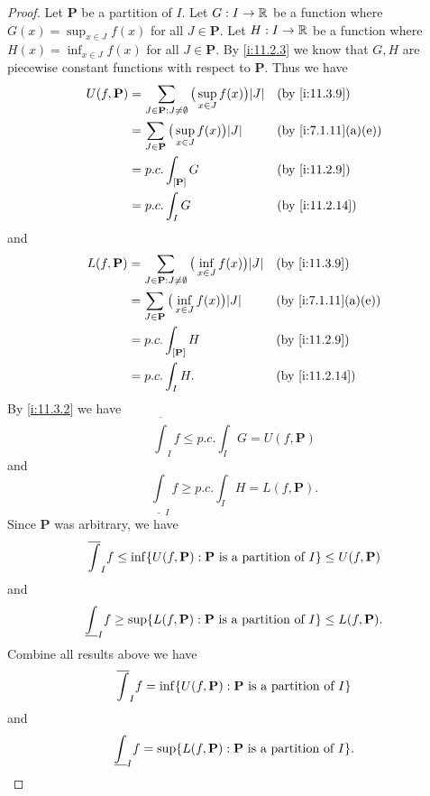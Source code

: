 \begin{proof}
  Let \(\mathbf{P}\) be a partition of \(I\).
  Let \(G : I \to \mathbb{R}\) be a function where \(G(x) = \sup_{x \in J} f(x)\) for all \(J \in \mathbf{P}\).
  Let \(H : I \to \mathbb{R}\) be a function where \(H(x) = \inf_{x \in J} f(x)\) for all \(J \in \mathbf{P}\).
  By \cref{i:11.2.3} we know that \(G, H\) are piecewise constant functions with respect to \(\mathbf{P}\).
  Thus we have
  \begin{align*}
    U(f, \mathbf{P}) & = \sum_{J \in \mathbf{P} : J \neq \emptyset} \big(\sup_{x \in J} f(x)\big) \abs{J} &  & \by{i:11.3.9}      \\
                     & = \sum_{J \in \mathbf{P}} \big(\sup_{x \in J} f(x)\big) \abs{J}                    &  & \by{i:7.1.11}[a,e] \\
                     & = p.c. \int_{[\mathbf{P}]} G                                                       &  & \by{i:11.2.9}      \\
                     & = p.c. \int_I G                                                                    &  & \by{i:11.2.14}
  \end{align*}
  and
  \begin{align*}
    L(f, \mathbf{P}) & = \sum_{J \in \mathbf{P} : J \neq \emptyset} \big(\inf_{x \in J} f(x)\big) \abs{J} &  & \by{i:11.3.9}      \\
                     & = \sum_{J \in \mathbf{P}} \big(\inf_{x \in J} f(x)\big) \abs{J}                    &  & \by{i:7.1.11}[a,e] \\
                     & = p.c. \int_{[\mathbf{P}]} H                                                       &  & \by{i:11.2.9}      \\
                     & = p.c. \int_I H.                                                                   &  & \by{i:11.2.14}
  \end{align*}
  By \cref{i:11.3.2} we have
  \[
    \overline{\int}_I f \leq p.c. \int_I G = U(f, \mathbf{P})
  \]
  and
  \[
    \underline{\int}_I f \geq p.c. \int_I H = L(f, \mathbf{P}).
  \]
  Since \(\mathbf{P}\) was arbitrary, we have
  \[
    \overline{\int}_I f \leq \inf\set{U(f, \mathbf{P}) : \mathbf{P} \text{ is a partition of } I} \leq U(f, \mathbf{P})
  \]
  and
  \[
    \underline{\int}_I f \geq \sup\set{L(f, \mathbf{P}) : \mathbf{P} \text{ is a partition of } I} \leq L(f, \mathbf{P}).
  \]
  Combine all results above we have
  \[
    \overline{\int}_I f = \inf\set{U(f, \mathbf{P}) : \mathbf{P} \text{ is a partition of } I}
  \]
  and
  \[
    \underline{\int}_I f = \sup\set{L(f, \mathbf{P}) : \mathbf{P} \text{ is a partition of } I}.
  \]
\end{proof}

